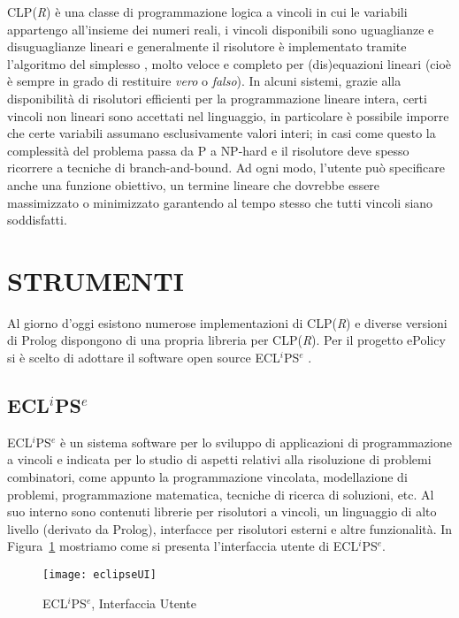 \documentclass[12pt,a4paper,openright,twoside]{report}
\begin{document}
CLP(\emph{R}) è una classe di programmazione logica a vincoli in cui le variabili appartengo all'insieme dei numeri reali, i vincoli disponibili sono uguaglianze e disuguaglianze lineari e generalmente il risolutore è implementato tramite l'algoritmo del simplesso \cite{dantzig51}, molto veloce e completo per (dis)equazioni lineari (cioè è sempre in grado di restituire \emph{vero} o \emph{falso}). In alcuni sistemi, grazie alla disponibilità di risolutori efficienti per la programmazione lineare intera, certi vincoli non lineari sono accettati nel linguaggio, in particolare è possibile imporre che certe variabili assumano esclusivamente valori interi; in casi come questo la complessità del problema passa da P a NP-hard e il risolutore deve spesso ricorrere a tecniche di branch-and-bound. Ad ogni modo, l'utente può specificare anche una funzione obiettivo, un termine lineare che dovrebbe essere massimizzato o minimizzato garantendo al tempo stesso che tutti vincoli siano soddisfatti.


\section{STRUMENTI}
Al giorno d'oggi esistono numerose implementazioni di CLP(\emph{R}) \cite{inclpR} e diverse versioni di Prolog dispongono di una propria libreria per CLP(\emph{R}). Per il progetto ePolicy si è scelto di adottare il software open source  ECL$^i$PS$^e$ \cite{clpEclipse,fromLPtoCLPeclipse}.

\subsection{ECL$^i$PS$^e$}
ECL$^i$PS$^e$ è un sistema software per lo sviluppo di applicazioni di programmazione a vincoli e indicata per lo studio di aspetti relativi alla risoluzione di problemi combinatori, come appunto la programmazione vincolata, modellazione di problemi, programmazione matematica, tecniche di ricerca di soluzioni, etc. Al suo interno sono contenuti librerie per risolutori a vincoli, un linguaggio di alto livello (derivato da Prolog), interfacce per risolutori esterni e altre funzionalità. In Figura~\ref{eclipseUI} mostriamo come si presenta l'interfaccia utente di ECL$^i$PS$^e$.

\begin{figure}[h]
	\centering
	\texttt{[image: eclipseUI]}
	\caption{ECL$^i$PS$^e$, Interfaccia Utente}
	\label{eclipseUI}
\end{figure}
\end{document}
